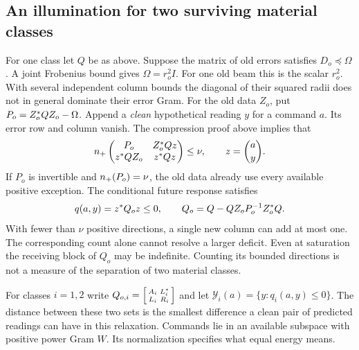 \subsection{An illumination for two surviving material classes}
For one class let $Q$ be as above. Suppose the matrix of old errors satisfies $D_o\preceq\Omega$. A joint Frobenius bound gives $\Omega=r_o^2 I$. For one old beam this is the scalar $r_o^2$. With several independent column bounds the diagonal of their squared radii does not in general dominate their error Gram. For the old data $Z_o$, put $P_o=Z_o\HH QZ_o-\Omega$. Append a \emph{clean} hypothetical reading $y$ for a command $a$. Its error row and column vanish. The compression proof above implies that
\[
 \nplus\begin{pmatrix}P_o&Z_o\HH Qz\\z\HH QZ_o&z\HH Qz\end{pmatrix}
 \leq\nu,\qquad z=\binom a y .
\]
If $P_o$ is invertible and $\nplus(P_o)=\nu$, the old data already use every available positive exception. The conditional future response satisfies
\begin{equation}
 q(a,y)=z\HH Q_o z\leq0,\qquad
 Q_o=Q-QZ_oP_o^{-1}Z_o\HH Q.                                \label{eq:cond}
\end{equation}
With fewer than $\nu$ positive directions, a single new column can add at most one. The corresponding count alone cannot resolve a larger deficit. Even at saturation the receiving block of $Q_o$ may be indefinite. Counting its bounded directions is not a measure of the separation of two material classes.

For classes $i=1,2$ write $Q_{o,i}=\left[\begin{smallmatrix} A_i&L_i\HH\\ L_i&R_i\end{smallmatrix}\right]$ and let $\mathcal Y_i(a)=\{y:q_i(a,y)\leq0\}$. The distance between these two sets is the smallest difference a clean pair of predicted readings can have in this relaxation. Commands lie in an available subspace with positive power Gram $W$. Its normalization specifies what equal energy means.

